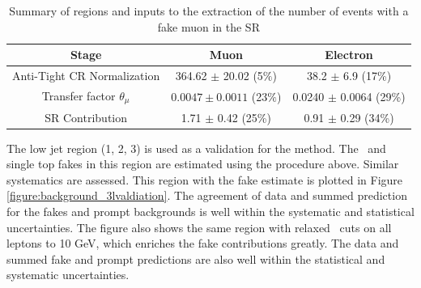 \begin{table}[!htbp]
\begin{center} 
\begin{tabular}{|c|c|c|} 
  \hline
  Stage   & Muon & Electron \\
  \hline
  Anti-Tight CR Normalization  &  364.62 $\pm$ 20.02 (5$\%$) & 38.2 $\pm$ 6.9 (17\%) \\ 
  \hline  
  Transfer factor $\theta_\mu$ & $0.0047 \pm 0.0011$ (23$\%$) & 0.0240 $\pm$ 0.0064 (29\%) \\
  SR Contribution & 1.71 $\pm$ 0.42 (25\%)           & 0.91 $\pm$ 0.29 (34\%) \\ 
  \hline  
\end{tabular}
\caption{Summary of regions and inputs to the extraction of the number of \btt events with a fake muon in the SR}
\label{table:background_3l_summary}
\end{center}
\end{table}


The low jet region (1, 2, 3) is used as a validation for the method. The \ttbar\ and single top fakes in this region are estimated using the procedure above. Similar systematics are assessed. This region with the fake estimate is plotted in Figure \ref{figure:background_3lvaldiation}. The agreement of data and summed prediction for the fakes and prompt backgrounds is well within the systematic and statistical uncertainties. The figure also shows the same region with relaxed \pt\ cuts on all leptons to 10 GeV, which enriches the fake contributions greatly.   The data and summed fake and prompt predictions are also well within the statistical and systematic uncertainties.


